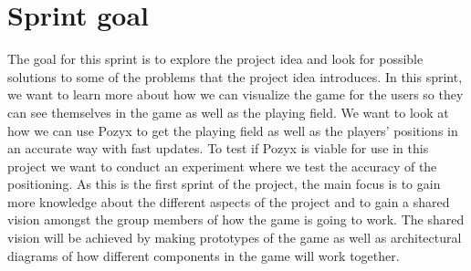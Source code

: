 \section{Sprint goal}
The goal for this sprint is to explore the project idea and look for possible solutions to some of the problems that the project idea introduces.
In this sprint, we want to learn more about how we can visualize the game for the users so they can see themselves in the game as well as the playing field.
We want to look at how we can use Pozyx to get the playing field as well as the players' positions in an accurate way with fast updates.
To test if Pozyx is viable for use in this project we want to conduct an experiment where we test the accuracy of the positioning.
As this is the first sprint of the project, the main focus is to gain more knowledge about the different aspects of the project and to gain a shared vision amongst the group members of how the game is going to work.
The shared vision will be achieved by making prototypes of the game as well as architectural diagrams of how different components in the game will work together.
